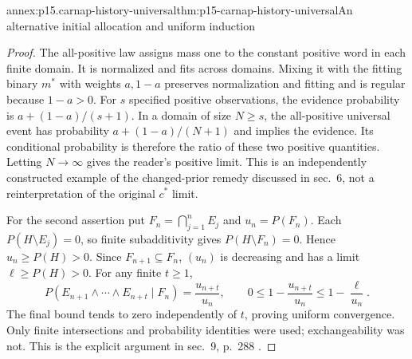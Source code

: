 \begin{annexitem}{annex:p15.carnap-history-universal}{thm:p15-carnap-history-universal}{An alternative initial allocation and uniform induction}
\begin{proof}
The all-positive law assigns mass one to the constant positive word in
each finite domain. It is normalized and fits across domains. Mixing
it with the fitting binary \(m^*\) with weights \(a,1-a\)
preserves normalization and fitting and is regular because \(1-a>0\).
For \(s\) specified positive observations, the evidence probability
is \(a+(1-a)/(s+1)\). In a domain of size \(N\geq s\), the
all-positive universal event has probability \(a+(1-a)/(N+1)\)
and implies the evidence. Its conditional probability is therefore the
ratio of these two positive quantities. Letting \(N\to\infty\)
gives the reader's positive limit. This is an independently constructed
example of the changed-prior remedy discussed in sec.~6, not a
reinterpretation of the original \(c^*\) limit.

For the second assertion put \(F_n=\bigcap_{j=1}^n E_j\) and
\(u_n=P(F_n)\). Each \(P(H\setminus E_j)=0\), so finite
subadditivity gives \(P(H\setminus F_n)=0\). Hence
\(u_n\geq P(H)>0\). Since \(F_{n+1}\subseteq F_n\),
\((u_n)\) is decreasing and has a limit
\(\ell\geq P(H)>0\). For any finite \(t\geq1\),
\[
 P(E_{n+1}\land\cdots\land E_{n+t}\mid F_n)
 =\frac{u_{n+t}}{u_n},\qquad
 0\leq1-\frac{u_{n+t}}{u_n}\leq1-\frac\ell{u_n}.
\]
The final bound tends to zero independently of \(t\), proving
uniform convergence. Only finite intersections and probability
identities were used; exchangeability was not. This is the explicit
argument in sec.~9, p.~288
\cite{Zabell2011CarnapInductiveInference}.
\end{proof}
\end{annexitem}
